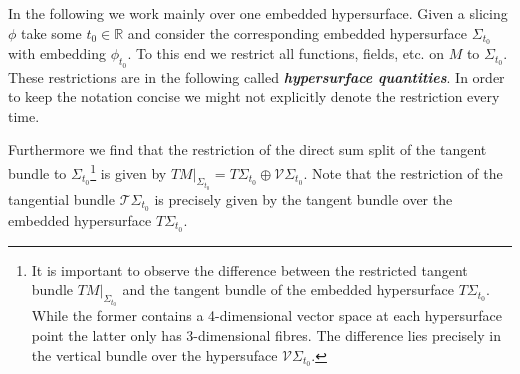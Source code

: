 \documentclass[a4paper,12pt, DIV=14, BCOR=5mm, twoside, headsepline]{scrbook}
\begin{document}
In the following we work mainly over one embedded hypersurface. Given a slicing $\phi$ take some $t_0 \in \mathbb{R}$ and consider the corresponding embedded hypersurface $\Sigma_{t_0}$ with embedding $\phi_{t_0}$. To this end we restrict all functions, fields, etc. on $M$ to $\Sigma_{t_0}$. These restrictions are in the following called \textbf{\textit{hypersurface quantities}}. In order to keep the notation concise we might not explicitly denote the restriction every time. 

Furthermore we find that the restriction of the direct sum split of the tangent bundle to $\Sigma_{t_0}$\footnote{It is important to observe the difference between the restricted tangent bundle $TM\vert_{\Sigma_{t_0}}$ and the tangent bundle of the embedded hypersurface $T\Sigma_{t_0}$. While the former contains a 4-dimensional vector space at each hypersurface point the latter only has 3-dimensional fibres. The difference lies precisely in the vertical bundle over the hypersuface $\mathcal{V}\Sigma_{t_0}$.} is given by $TM \vert _{\Sigma_{t_0}} = T\Sigma _{t_0} \oplus \mathcal{V}\Sigma _{t_0}$. Note that the restriction of the tangential bundle $\mathcal{T}\Sigma_{t_0}$ is precisely given by the tangent bundle over the embedded hypersurface $T\Sigma_{t_0}$.
\end{document}
